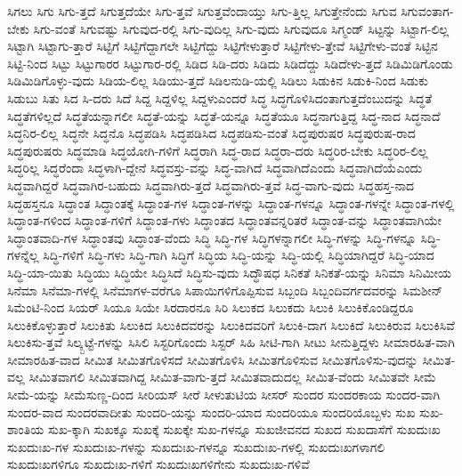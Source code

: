 {ಸಿಗಲು
ಸಿಗು
ಸಿಗು-ತ್ತದೆ
ಸಿಗುತ್ತದೆಯೇ
ಸಿಗು-ತ್ತವೆ
ಸಿಗುತ್ತವೆಂದಾಯ್ತು
ಸಿಗು-ತ್ತಿಲ್ಲ
ಸಿಗುತ್ತೇನೆಂದು
ಸಿಗುವ
ಸಿಗುವಂತಾಗ-ಬೇಕು
ಸಿಗು-ವಂತೆ
ಸಿಗುವಷ್ಟು
ಸಿಗುವುದ-ರಲ್ಲಿ
ಸಿಗು-ವುದಿಲ್ಲ
ಸಿಗು-ವುದು
ಸಿಗುವುದೂ
ಸಿಗ್ಮಂಡ್
ಸಿಟ್ಟನ್ನು
ಸಿಟ್ಟಾಗ-ಲಿಲ್ಲ
ಸಿಟ್ಟಾಗಿ
ಸಿಟ್ಟಾಗು-ತ್ತಾರೆ
ಸಿಟ್ಟಿಗೆ
ಸಿಟ್ಟಿಗೆದ್ದಾಗಲೇ
ಸಿಟ್ಟಿಗೆದ್ದು
ಸಿಟ್ಟಿಗೇಳುತ್ತಾರೆ
ಸಿಟ್ಟಿಗೇಳು-ತ್ತೇವೆ
ಸಿಟ್ಟಿಗೇಳು-ವಂತೆ
ಸಿಟ್ಟಿನ
ಸಿಟ್ಟಿ-ನಿಂದ
ಸಿಟ್ಟು
ಸಿಟ್ಟುಗಾರರ
ಸಿಟ್ಟುಗಾರ-ರಲ್ಲಿ
ಸಿಡಿದ
ಸಿಡಿ-ದರು
ಸಿಡಿದು
ಸಿಡಿದೆದ್ದು
ಸಿಡಿದೇಳು-ತ್ತದೆ
ಸಿಡಿಮಿಡಿಗೊಂಡು
ಸಿಡಿಮಿಡಿಗೊಳ್ಳು-ವುದು
ಸಿಡಿಯ-ಲಿಲ್ಲ
ಸಿಡಿಯು-ತ್ತದೆ
ಸಿಡಿಲನುಡಿ-ಯಲ್ಲಿ
ಸಿಡಿಲು
ಸಿಡುಕಿನ
ಸಿಡುಕಿ-ನಿಂದ
ಸಿಡುಕು
ಸಿಡುಬು
ಸಿತು
ಸಿದ
ಸಿ-ದರು
ಸಿದೆ
ಸಿದ್ದ
ಸಿದ್ದಳಿಲ್ಲ
ಸಿದ್ದಳುಎಂದರೆ
ಸಿದ್ಧ
ಸಿದ್ಧಗೊಳಿಸಿದಂತಾಗುತ್ತದೆಂಬುದನ್ನು
ಸಿದ್ಧತೆ
ಸಿದ್ಧತೆಗಳಿಲ್ಲದೆ
ಸಿದ್ಧತೆಯನ್ನಾಗಲೀ
ಸಿದ್ಧತೆ-ಯನ್ನು
ಸಿದ್ಧತೆ-ಯನ್ನೂ
ಸಿದ್ಧತೆಯೂ
ಸಿದ್ಧನಾಗುತ್ತಿದ್ದ
ಸಿದ್ಧ-ನಾದ
ಸಿದ್ಧನಾದೆ
ಸಿದ್ಧನಿರ-ಲಿಲ್ಲ
ಸಿದ್ಧನೇ
ಸಿದ್ಧನೊ
ಸಿದ್ಧಪಡಿಸಿ
ಸಿದ್ಧಪಡಿಸಿದ
ಸಿದ್ಧಪಡಿಸು-ವಂತೆ
ಸಿದ್ಧಪುರುಷರ
ಸಿದ್ಧಪುರುಷ-ರಾದ
ಸಿದ್ಧಪುರುಷರು
ಸಿದ್ಧಮಾಡಿ
ಸಿದ್ಧಯೋಗಿ-ಗಳಿಗೆ
ಸಿದ್ಧರಾಗಿ
ಸಿದ್ಧ-ರಾದ
ಸಿದ್ಧರಾ-ದರು
ಸಿದ್ಧರಿರ-ಬೇಕು
ಸಿದ್ಧರಿರ-ಲಿಲ್ಲ
ಸಿದ್ಧರಿಲ್ಲ
ಸಿದ್ಧರೆಂದಾ
ಸಿದ್ಧಳಾಗಿ-ದ್ದೇನೆ
ಸಿದ್ಧವಸ್ತು-ವನ್ನು
ಸಿದ್ಧ-ವಾಗಿದೆ
ಸಿದ್ಧವಾಗಿದೆಎಂದು
ಸಿದ್ಧವಾಗಿದೆಯೆಎಂದು
ಸಿದ್ಧವಾಗಿದ್ದರೆ
ಸಿದ್ಧವಾಗಿರ-ಬಹುದು
ಸಿದ್ಧವಾಗಿರು-ತ್ತದೆ
ಸಿದ್ಧವಾಗಿರು-ತ್ತವೆ
ಸಿದ್ಧ-ವಾಗು-ವುದು
ಸಿದ್ಧಹಸ್ತ-ನಾದ
ಸಿದ್ಧಹಸ್ತನೂ
ಸಿದ್ಧಾಂತ
ಸಿದ್ಧಾಂತಕ್ಕೆ
ಸಿದ್ಧಾಂತ-ಗಳ
ಸಿದ್ಧಾಂತ-ಗಳನ್ನು
ಸಿದ್ಧಾಂತ-ಗಳನ್ನೂ
ಸಿದ್ಧಾಂತ-ಗಳನ್ನೇ
ಸಿದ್ಧಾಂತ-ಗಳಲ್ಲಿ
ಸಿದ್ಧಾಂತ-ಗಳಿಂದ
ಸಿದ್ಧಾಂತ-ಗಳಿಗೆ
ಸಿದ್ಧಾಂತ-ಗಳು
ಸಿದ್ಧಾಂತದ
ಸಿದ್ಧಾಂತವನ್ನರಿತರೆ
ಸಿದ್ಧಾಂತ-ವನ್ನು
ಸಿದ್ಧಾಂತವಾಗಿಯೇ
ಸಿದ್ಧಾಂತವಾದಿ-ಗಳ
ಸಿದ್ಧಾಂತವು
ಸಿದ್ಧಾಂತ-ವೆಂದು
ಸಿದ್ಧಿ
ಸಿದ್ಧಿ-ಗಳ
ಸಿದ್ಧಿಗಳನ್ನಾಗಲೀ
ಸಿದ್ಧಿ-ಗಳನ್ನು
ಸಿದ್ಧಿ-ಗಳನ್ನೂ
ಸಿದ್ಧಿ-ಗಳನ್ನೆಲ್ಲ
ಸಿದ್ಧಿ-ಗಳಿಗೆ
ಸಿದ್ಧಿ-ಗಳು
ಸಿದ್ಧಿ-ಗಾಗಿ
ಸಿದ್ಧಿಗೆ
ಸಿದ್ಧಿಯ
ಸಿದ್ಧಿ-ಯನ್ನು
ಸಿದ್ಧಿ-ಯಲ್ಲಿ
ಸಿದ್ಧಿಯಾಗಿದ್ದರೆ
ಸಿದ್ಧಿ-ಯಾದ
ಸಿದ್ಧಿ-ಯಾ-ಯಿತು
ಸಿದ್ಧಿಯು
ಸಿದ್ಧಿಯೇ
ಸಿದ್ಧಿಸಿದೆ
ಸಿದ್ಧಿಸು-ವುದು
ಸಿದ್ಧೌಷಧ
ಸಿನಿಕತೆ
ಸಿನಿಕತೆ-ಯನ್ನು
ಸಿನಿಮಾ
ಸಿನಿಮೀಯ
ಸಿನೆಮಾ
ಸಿನೆಮಾ-ಗಳಲ್ಲಿ
ಸಿನೆಮಾಗಳ-ವರೆಗೂ
ಸಿಪಾಯಿಗಳಿಗೊಪ್ಪಿಸುವ
ಸಿಬ್ಬಂದಿ
ಸಿಬ್ಬಂದಿವರ್ಗದವರನ್ನು
ಸಿಮಶೀನ್
ಸಿಮೆಂಟಿ-ನಿಂದ
ಸಿಯರ್
ಸಿಯೂ
ಸಿಯೇ
ಸಿರದಾರನೂ
ಸಿರಿ
ಸಿಲುಕದ
ಸಿಲುಕದು
ಸಿಲುಕಿ
ಸಿಲುಕಿಕೊಂಡಿದ್ದರೂ
ಸಿಲುಕಿಕೊಳ್ಳುತ್ತಾರೆ
ಸಿಲುಕಿತು
ಸಿಲುಕಿದ
ಸಿಲುಕಿದವರನ್ನು
ಸಿಲುಕಿದವರಿಗೆ
ಸಿಲುಕಿ-ದಾಗ
ಸಿಲುಕಿದೆ
ಸಿಲುಕಿರುವ
ಸಿಲುಕಿಸಿವೆ
ಸಿಲುಕಿಸು-ತ್ತವೆ
ಸಿಲ್ಕ್ಬಟ್ಟೆ-ಗಳನ್ನು
ಸಿಸಿಲಿ
ಸಿಸ್ಟರಿಗೊಂದು
ಸಿಸ್ಟರ್
ಸಿಹಿ
ಸೀಟಿ-ಗಾಗಿ
ಸೀಟು
ಸೀನುತ್ತಿದ್ದಳು
ಸೀಮಾರಹಿತ-ವಾಗಿ
ಸೀಮಾರಹಿತ-ವಾದ
ಸೀಮಿತ
ಸೀಮಿತಗೊಳಿಸದೆ
ಸೀಮಿತಗೊಳಿಸಿ
ಸೀಮಿತಗೊಳಿಸುವ
ಸೀಮಿತಗೊಳಿಸು-ವುದನ್ನು
ಸೀಮಿತ-ವಲ್ಲ
ಸೀಮಿತವಾಗಲಿ
ಸೀಮಿತವಾಗಿದ್ದ
ಸೀಮಿತ-ವಾಗು-ತ್ತದೆ
ಸೀಮಿತವಾದುದಲ್ಲ
ಸೀಮಿತ-ವೆಂದು
ಸೀಮಿತವೇ
ಸೀಮೆ
ಸೀಮೆ-ಯನ್ನು
ಸೀಮೆಸುಣ್ಣ-ದಿಂದ
ಸೀರಿಯಸ್
ಸೀರೆ
ಸೀಳುತುಟಿಯ
ಸೀಸರ್
ಸುಂದರ
ಸುಂದರಕಾಯ
ಸುಂದರ-ವಾಗಿ
ಸುಂದರ-ವಾದ
ಸುಂದರವಾದೀತು
ಸುಂದರಿ-ಯನ್ನು
ಸುಂದರಿ-ಯಾದ
ಸುಂದರಿಯೂ
ಸುಂದರಿಯೊಬ್ಬಳು
ಸುಖ
ಸುಖ-ಶಾಂತಿಯ
ಸುಖ-ಕ್ಕಾಗಿ
ಸುಖಕ್ಕೂ
ಸುಖಕ್ಕೆ
ಸುಖಕ್ಕೇ
ಸುಖ-ಗಳನ್ನೂ
ಸುಖಜೀವನದ
ಸುಖದ
ಸುಖದಾಸೆಗೆ
ಸುಖದುಃಖ
ಸುಖದುಃಖ-ಗಳ
ಸುಖದುಃಖ-ಗಳನ್ನು
ಸುಖದುಃಖ-ಗಳನ್ನೂ
ಸುಖದುಃಖ-ಗಳಲ್ಲಿ
ಸುಖದುಃಖಗಳಾಗಲಿ
ಸುಖದುಃಖಗಳಿಗೂ
ಸುಖದುಃಖ-ಗಳಿಗೆ
ಸುಖದುಃಖಗಳಿಗೇನು
ಸುಖದುಃಖ-ಗಳಿವೆ
}
